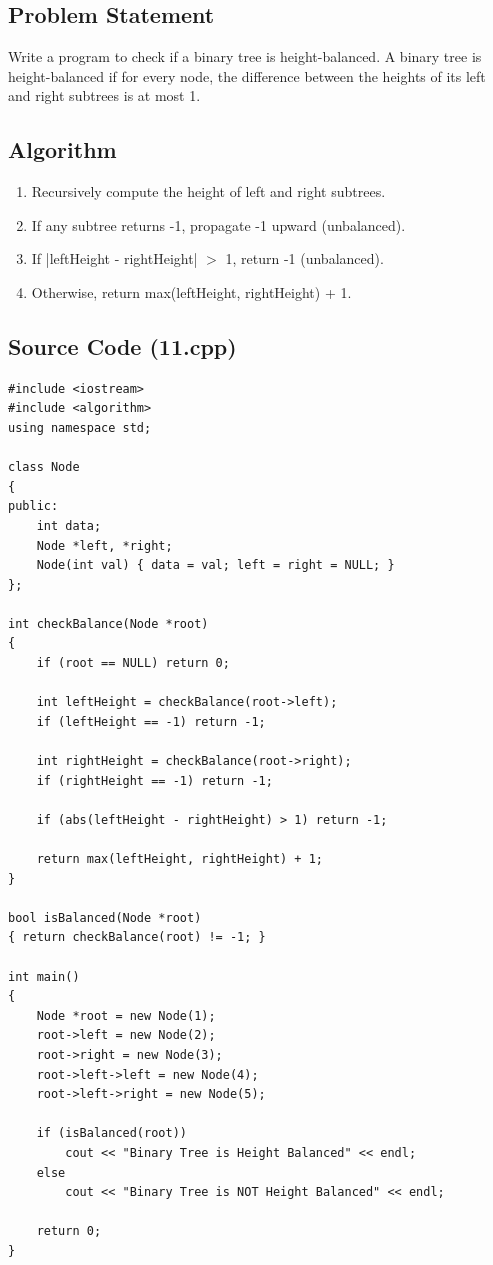\documentclass[a4paper,12pt]{article}
\begin{document}
\subsection*{Problem Statement}
Write a program to check if a binary tree is height-balanced. A binary tree is height-balanced if for every node, the difference between the heights of its left and right subtrees is at most 1.

\subsection*{Algorithm}
\begin{enumerate}
    \item Recursively compute the height of left and right subtrees.
    \item If any subtree returns -1, propagate -1 upward (unbalanced).
    \item If |leftHeight - rightHeight| $>$ 1, return -1 (unbalanced).
    \item Otherwise, return max(leftHeight, rightHeight) + 1.
\end{enumerate}

\subsection*{Source Code (11.cpp)}
\begin{lstlisting}[style=cppstyle]
#include <iostream>
#include <algorithm>
using namespace std;

class Node
{
public:
    int data;
    Node *left, *right;
    Node(int val) { data = val; left = right = NULL; }
};

int checkBalance(Node *root)
{
    if (root == NULL) return 0;

    int leftHeight = checkBalance(root->left);
    if (leftHeight == -1) return -1;

    int rightHeight = checkBalance(root->right);
    if (rightHeight == -1) return -1;

    if (abs(leftHeight - rightHeight) > 1) return -1;

    return max(leftHeight, rightHeight) + 1;
}

bool isBalanced(Node *root)
{ return checkBalance(root) != -1; }

int main()
{
    Node *root = new Node(1);
    root->left = new Node(2);
    root->right = new Node(3);
    root->left->left = new Node(4);
    root->left->right = new Node(5);

    if (isBalanced(root))
        cout << "Binary Tree is Height Balanced" << endl;
    else
        cout << "Binary Tree is NOT Height Balanced" << endl;

    return 0;
}
\end{lstlisting}
\end{document}

